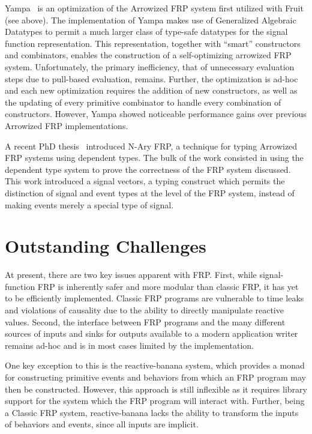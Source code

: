 Yampa~\cite{Nilsson2005} is an optimization of the Arrowized FRP system first
utilized with Fruit (see above). The implementation of Yampa makes use of
Generalized Algebraic Datatypes to permit a much larger class of type-safe
datatypes for the signal function representation. This representation,
together with ``smart'' constructors and combinators, enables the construction
of a self-optimizing arrowized FRP system. Unfortunately, the primary
inefficiency, that of unnecessary evaluation steps due to pull-based evaluation,
remains. Further, the optimization is ad-hoc and each new optimization requires
the addition of new constructors, as well as the updating of every primitive
combinator to handle every combination of constructors. However, Yampa showed
noticeable performance gains over previous Arrowized FRP implementations.

A recent PhD thesis~\cite{Sculthorpe2011} introduced N-Ary FRP, a technique for
typing Arrowized FRP systems using dependent types. The bulk of the work
consisted in using the dependent type system to prove the correctness of the FRP
system discussed. This work introduced a signal vectors, a typing construct
which permits the distinction of signal and event types at the level of the FRP
system, instead of making events merely a special type of signal.

\section{Outstanding Challenges}
\label{section:Background-outstanding_challenges}

At present, there are two key issues apparent with FRP. First, while
signal-function FRP is inherently safer and more modular than classic FRP, it
has yet to be efficiently implemented. Classic FRP programs are vulnerable to
time leaks and violations of causality due to the ability to directly manipulate
reactive values. Second, the interface between FRP programs and the many
different sources of inputs and sinks for outputs available to a modern
application writer remains ad-hoc and is in most cases limited by the
implementation.

One key exception to this is the reactive-banana system, which provides a monad
for constructing primitive events and behaviors from which an FRP program may
then be constructed. However, this approach is still inflexible as it requires
library support for the system which the FRP program will interact with.
Further, being a Classic FRP system, reactive-banana lacks the ability to
transform the inputs of behaviors and events, since all inputs are implicit.
